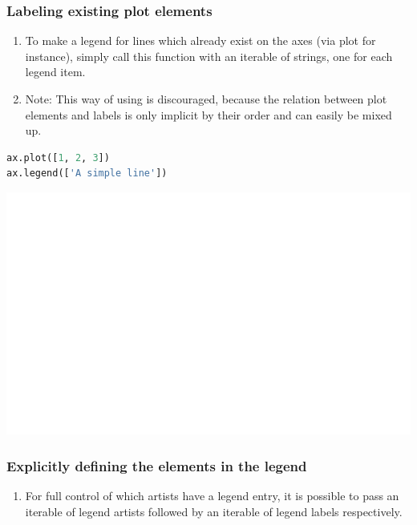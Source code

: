 \documentclass[UTF8,a4paper,12pt]{ctexart}  %
\providecommand{\tightlist}{\setlength{\itemsep}{0pt}\setlength{\parskip}{0pt}}
\begin{document}
\hypertarget{labeling-existing-plot-elements}{%
\subsubsection{Labeling existing plot elements}\label{labeling-existing-plot-elements}}

\begin{enumerate}
\def\labelenumi{\arabic{enumi}.}
\tightlist
\item
  To make a legend for lines which already exist on the axes (via plot
  for instance), simply call this function with an iterable of
  strings, one for each legend item.
\item
  Note: This way of using is discouraged, because the relation between
  plot elements and labels is only implicit by their order and can
  easily be mixed up.
\end{enumerate}

\begin{lstlisting}[language=Python]
ax.plot([1, 2, 3])
ax.legend(['A simple line'])
\end{lstlisting}

\begin{center}\includegraphics[width=0.9\linewidth]{python-visualization_files/figure-latex/unnamed-chunk-46-1} \end{center}

\hypertarget{explicitly-defining-the-elements-in-the-legend}{%
\subsubsection{Explicitly defining the elements in the legend}\label{explicitly-defining-the-elements-in-the-legend}}

\begin{enumerate}
\def\labelenumi{\arabic{enumi}.}
\tightlist
\item
  For full control of which artists have a legend entry, it is
  possible to pass an iterable of legend artists followed by an
  iterable of legend labels respectively.
\end{enumerate}
\end{document}
